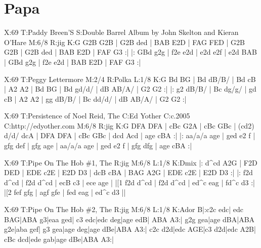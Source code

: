 \documentclass{article}
\begin{document}
\section{Papa}

\begin{abc}[name]
X:69
T:Paddy Breen'S
S:Double Barrel Album by John Skelton and Kieran O'Hare
M:6/8
R:jig
K:G
G2B G2B | G2B ded | BAB E2D | FAG FED |
G2B G2B | G2B ded | BAB E2D | FAF G3 :|
|: GBd g2g | f2e e2d | e2d e2f | e2d BAB |
GBd g2g | f2e e2d | BAB E2D | FAF G3 :|
\end{abc}

\begin{abc}[name]
X:69
T:Peggy Lettermore
M:2/4
R:Polka
L:1/8
K:G
Bd BG | Bd dB/B/ | Bd cB | A2 A2 |
Bd BG | Bd gd/d/ | dB AB/A/ | G2 G2 :|
|: g2 dB/B/ | Bc dg/g/ | gd cB | A2 A2 |
gg dB/B/ | Bc dd/d/ | dB AB/A/ | G2 G2 :|
\end{abc}

\begin{abc}[name]
X:69
T:Persistence of Noel Reid, The
C:Ed Yother
C:c.2005
C:http://edyother.com
M:6/8
R:jig
K:G
DFA DFA | cBc G2A | cBc GBc | ({c}d2) d/d/ dcA |
DFA DFA | cBc GBc | dcd Acd | age cBA :|
|: aa/a/a age | ged e2 f | gfg def | gfg age |
aa/a/a age | ged e2 f | gfg dfg | age cBA :|
\end{abc}

\begin{abc}[name]
X:69
T:Pipe On The Hob \#1, The
R:jig
M:6/8
L:1/8
K:Dmix
|: d^cd A2G | F2D DED | EDE c2E | E2D D3 |
dcB cBA | BAG A2G | EDE c2E | E2D D3 :|
|: f2d d^cd | f2d d^cd | ecB c3 | ece age |
|[1 f2d d^cd | f2d d^cd | ed^c eag | fd^c d3 :|
|[2 fef gfg | agf gfe | fed eag | ed^c d3 ||
\end{abc}

\begin{abc}[name]
X:69
T:Pipe On The Hob \#2, The
R:jig
M:6/8
L:1/8
K:Ador
B|:c2c edc| edc BAG|ABA g3|eaa ged|
c3 edc|edc deg|age edB| ABA A3:|
g2g gea|age dBA|ABA g2e|aba gef|
g3 gea|age deg|age dBe|ABA A3:|
c2c d2d|edc AGE|c3 d2d|edc A2B|
cBc dcd|ede gab|age dBe|ABA A3:|
\end{abc}
\end{document}
